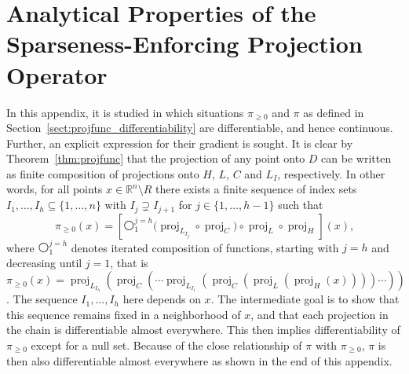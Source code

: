 \documentclass[twoside,11pt]{article}
\DeclareMathOperator{\proj}{proj}
\newcommand{\R}{\mathbb{R}}
\newcommand{\0}{\mathcal{O}}
\newcommand{\discint}[2]{\{#1,\dotsc,#2\}}
\newcommand{\inint}[2]{\in\discint{#1}{#2}}
\begin{document}
\section{Analytical Properties of the Sparseness-Enforcing Projection Operator}
\label{sect:analytical_properties}
In this appendix, it is studied in which situations $\pi_{\geq 0}$ and $\pi$ as defined in Section~\ref{sect:projfunc_differentiability} are differentiable, and hence continuous.
Further, an explicit expression for their gradient is sought.
It is clear by Theorem~\ref{thm:projfunc} that the projection of any point onto $D$ can be written as finite composition of projections onto $H$, $L$, $C$ and $L_I$, respectively.
In other words, for all points $x\in\R^n\setminus R$ there exists a finite sequence of index sets $I_1,\dotsc,I_h\subseteq\discint{1}{n}$ with $I_j\supsetneq I_{j+1}$ for $j\inint{1}{h-1}$ such that
\begin{displaymath}
  \pi_{\geq 0}(x) = \left[\medcirc^{j=h}_1\big(\proj_{L_{I_j}}\circ\proj_C\big)\circ\proj_L\circ\proj_H\right](x)\text{,}
\end{displaymath}
where $\medcirc^{j=h}_1$ denotes iterated composition of functions, starting with $j = h$ and decreasing until $j = 1$, that is
$\pi_{\geq 0}(x) = \proj_{L_{I_h}}(\proj_C(\cdots\proj_{L_{I_1}}(\proj_C(\proj_L(\proj_H(x))))\cdots))$.
The sequence $I_1,\dotsc,I_h$ here depends on $x$.
The intermediate goal is to show that this sequence remains fixed in a neighborhood of $x$, and that each projection in the chain is differentiable almost everywhere.
This then implies differentiability of $\pi_{\geq 0}$ except for a null set.
Because of the close relationship of $\pi$ with $\pi_{\geq 0}$, $\pi$ is then also differentiable almost everywhere as shown in the end of this appendix.
\end{document}
